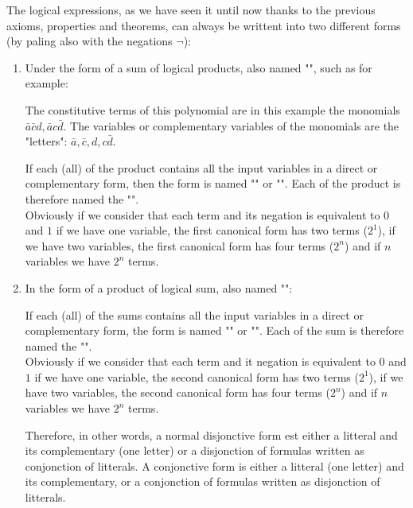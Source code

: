 	The logical expressions, as we have seen it until now thanks to the previous axioms, properties and theorems, can always be writtent into two different forms (by paling also with the negations $\neg$):
	\begin{enumerate}
		\item Under the form of a sum of logical products, also named "", such as for example:
		
		The constitutive terms of this polynomial are in this example the monomials $\bar{a}\bar{c}d,\bar{a}c\bar{d}$. The variables or complementary variables of the monomials are the "letters": $\bar{a},\bar{c},d,c\bar{d}$.
		\begin{tcolorbox}[title=Remark,colframe=black,arc=10pt]
		If each (all) of the product contains all the input variables in a direct or complementary form, then the form is named "" or "". Each of the product is therefore named the "".\\
		
		Obviously if we consider that each term and its negation is equivalent to $0$ and $1$ if we have one variable, the first canonical form has two terms  ($2^1$), if we have two variables, the first canonical form has four terms ($2^n$) and if $n$ variables we have $2^n$ terms.
		\end{tcolorbox}
		
		\item In the form of a product of logical sum, also named "":
		
		\begin{tcolorbox}[title=Remark,colframe=black,arc=10pt]
		If each (all) of the sums contains all the input variables in a direct or complementary form, the form is named "" or "". Each of the sum is therefore named the "".\\
		
		Obviously if we consider that each term and it negation is equivalent to $0$ and $1$ if we have one variable, the second canonical form has two terms  ($2^1$), if we have two variables, the second canonical form has four terms ($2^n$) and if $n$ variables we have $2^n$ terms.
		\end{tcolorbox}
		Therefore, in other words, a normal disjonctive form est either a litteral and its complementary (one letter) or a disjonction of formulas written as conjonction of litterals. A conjonctive form is either a litteral (one letter) and its complementary, or a conjonction of formulas written as disjonction of litterals.
	\end{enumerate}
